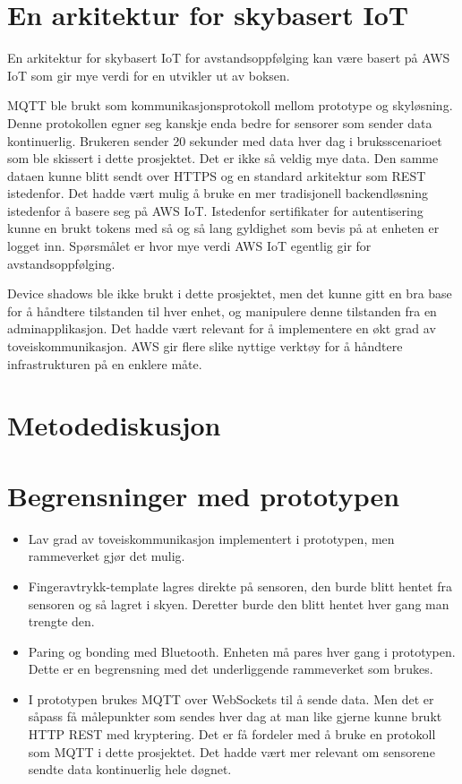 \section{En arkitektur for skybasert IoT}
En arkitektur for skybasert IoT for avstandsoppfølging kan være basert på AWS IoT som gir mye verdi for en utvikler ut av boksen.

MQTT ble brukt som kommunikasjonsprotokoll mellom prototype og skyløsning. Denne protokollen egner seg kanskje enda bedre for sensorer
som sender data kontinuerlig. Brukeren sender 20 sekunder med data hver dag i bruksscenarioet som ble skissert i dette prosjektet. Det er ikke så veldig
mye data. Den samme dataen kunne blitt sendt over HTTPS og en standard arkitektur som REST istedenfor. Det hadde vært mulig å bruke
en mer tradisjonell backendløsning istedenfor å basere seg på AWS IoT. Istedenfor sertifikater for autentisering
kunne en brukt tokens med så og så lang gyldighet som bevis på at enheten er logget inn. Spørsmålet er hvor mye verdi AWS IoT egentlig gir
for avstandsoppfølging.

Device shadows ble ikke brukt i dette prosjektet, men det kunne gitt en bra base for å håndtere tilstanden til hver enhet, og manipulere denne tilstanden
fra en adminapplikasjon. Det hadde vært relevant for å implementere en økt grad av toveiskommunikasjon. AWS gir flere slike nyttige verktøy for
å håndtere infrastrukturen på en enklere måte.

\section{Metodediskusjon}


\iffalse
\section{Begrensninger med
prototypen}\label{begrensninger-med-prototypen}

\begin{itemize}
\tightlist
\item
  Lav grad av toveiskommunikasjon implementert i prototypen, men rammeverket gjør det mulig.
\item
  Fingeravtrykk-template lagres direkte på sensoren, den burde blitt
  hentet fra sensoren og så lagret i skyen. Deretter burde den blitt
  hentet hver gang man trengte den.
\item
  Paring og bonding med Bluetooth. Enheten må pares hver gang i
  prototypen. Dette er en begrensning med det underliggende rammeverket
  som brukes.
\item
  I prototypen brukes MQTT over WebSockets til å sende data. Men det er
  såpass få målepunkter som sendes hver dag at man like gjerne kunne
  brukt HTTP REST med kryptering. Det er få fordeler med å bruke en
  protokoll som MQTT i dette prosjektet. Det hadde vært mer relevant om
  sensorene sendte data kontinuerlig hele døgnet.
\end{itemize}


